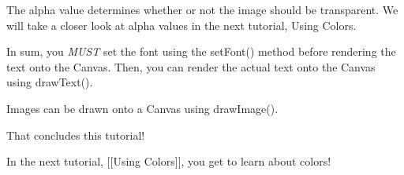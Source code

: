 The alpha value determines whether or not the image should be transparent. We will take a closer look at alpha values in the next tutorial, Using Colors.

In sum, you {\itshape M\+U\+S\+T} set the font using the set\+Font() method before rendering the text onto the Canvas. Then, you can render the actual text onto the Canvas using draw\+Text().

Images can be drawn onto a Canvas using draw\+Image().

That concludes this tutorial!

In the next tutorial, \mbox{[}\mbox{[}Using Colors\mbox{]}\mbox{]}, you get to learn about colors! 